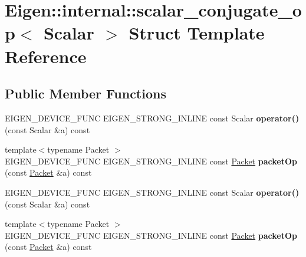 \hypertarget{struct_eigen_1_1internal_1_1scalar__conjugate__op}{}\section{Eigen\+:\+:internal\+:\+:scalar\+\_\+conjugate\+\_\+op$<$ Scalar $>$ Struct Template Reference}
\label{struct_eigen_1_1internal_1_1scalar__conjugate__op}
\subsection*{Public Member Functions}
\begin{DoxyCompactItemize}
\item 
\mbox{\label{struct_eigen_1_1internal_1_1scalar__conjugate__op_a90613357940087806d7b629e7258b45f}} 
E\+I\+G\+E\+N\+\_\+\+D\+E\+V\+I\+C\+E\+\_\+\+F\+U\+NC E\+I\+G\+E\+N\+\_\+\+S\+T\+R\+O\+N\+G\+\_\+\+I\+N\+L\+I\+NE const Scalar {\bfseries operator()} (const Scalar \&a) const
\item 
\mbox{\label{struct_eigen_1_1internal_1_1scalar__conjugate__op_a298f1da62e5ad65656c8dcc13ebaadfa}} 
{\footnotesize template$<$typename Packet $>$ }\\E\+I\+G\+E\+N\+\_\+\+D\+E\+V\+I\+C\+E\+\_\+\+F\+U\+NC E\+I\+G\+E\+N\+\_\+\+S\+T\+R\+O\+N\+G\+\_\+\+I\+N\+L\+I\+NE const \hyperlink{union_eigen_1_1internal_1_1_packet}{Packet} {\bfseries packet\+Op} (const \hyperlink{union_eigen_1_1internal_1_1_packet}{Packet} \&a) const
\item 
\mbox{\label{struct_eigen_1_1internal_1_1scalar__conjugate__op_a90613357940087806d7b629e7258b45f}} 
E\+I\+G\+E\+N\+\_\+\+D\+E\+V\+I\+C\+E\+\_\+\+F\+U\+NC E\+I\+G\+E\+N\+\_\+\+S\+T\+R\+O\+N\+G\+\_\+\+I\+N\+L\+I\+NE const Scalar {\bfseries operator()} (const Scalar \&a) const
\item 
\mbox{\label{struct_eigen_1_1internal_1_1scalar__conjugate__op_a298f1da62e5ad65656c8dcc13ebaadfa}} 
{\footnotesize template$<$typename Packet $>$ }\\E\+I\+G\+E\+N\+\_\+\+D\+E\+V\+I\+C\+E\+\_\+\+F\+U\+NC E\+I\+G\+E\+N\+\_\+\+S\+T\+R\+O\+N\+G\+\_\+\+I\+N\+L\+I\+NE const \hyperlink{union_eigen_1_1internal_1_1_packet}{Packet} {\bfseries packet\+Op} (const \hyperlink{union_eigen_1_1internal_1_1_packet}{Packet} \&a) const
\end{DoxyCompactItemize}


